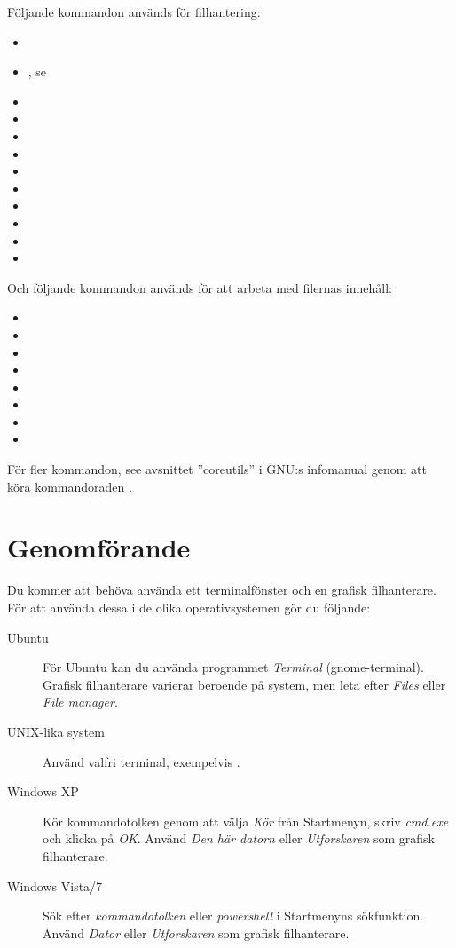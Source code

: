 \documentclass[a4paper,nocourse]{miunasgn}
\begin{document}
Följande kommandon används för filhantering:
\begin{itemize}
  \item {}
  \item {}, se 
  \item {}
  \item {}
  \item {}
  \item {}
  \item {}
  \item {}
  \item {}
  \item {}
  \item {}
  \item {}
\end{itemize}

Och följande kommandon används för att arbeta med filernas innehåll:
\begin{itemize}
  \item {}
  \item {}
  \item {}
  \item {}
  \item {}
  \item {}
  \item {}
  \item {}
\end{itemize}

För fler kommandon, see avsnittet ''coreutils'' i GNU:s infomanual genom att 
köra kommandoraden .


\section{Genomförande}
\label{sec:Genomforande}
\noindent
Du kommer att behöva använda ett terminalfönster och en grafisk filhanterare.
För att använda dessa i de olika operativsystemen gör du följande:
\begin{description}
  \item[Ubuntu] För Ubuntu kan du använda programmet \emph{Terminal} 
    (gnome-terminal).
    Grafisk filhanterare varierar beroende på system, men leta efter 
    \emph{Files} eller \emph{File manager}.
  \item[UNIX-lika system] Använd valfri terminal, exempelvis .
  \item[Windows XP] Kör kommandotolken genom att välja \emph{Kör} från
    Startmenyn, skriv \emph{cmd.exe} och klicka på \emph{OK}.
    Använd \emph{Den här datorn} eller \emph{Utforskaren} som grafisk
    filhanterare.
  \item[Windows Vista/7] Sök efter \emph{kommandotolken} eller
    \emph{powershell} i Startmenyns sökfunktion.
    Använd \emph{Dator} eller \emph{Utforskaren} som grafisk filhanterare.
\end{description}
\end{document}
